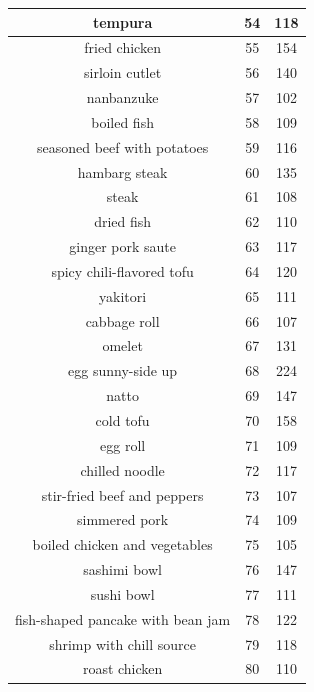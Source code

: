 {\begin{longtable}{| c | c | c|}
        \hline
        tempura  &  54  &  118  \\
        \hline
        fried chicken  &  55  &  154  \\
        \hline
        sirloin cutlet  &  56  &  140  \\
        \hline
        nanbanzuke  &  57  &  102  \\
        \hline
        boiled fish  &  58  &  109  \\
        \hline
        seasoned beef with potatoes  &  59  &  116  \\
        \hline
        hambarg steak  &  60  &  135  \\
        \hline
        steak  &  61  &  108  \\
        \hline
        dried fish  &  62  &  110  \\
        \hline
        ginger pork saute  &  63  &  117  \\
        \hline
        spicy chili-flavored tofu  &  64  &  120  \\
        \hline
        yakitori  &  65  &  111  \\
        \hline
        cabbage roll  &  66  &  107  \\
        \hline
        omelet  &  67  &  131  \\
        \hline
        egg sunny-side up  &  68  &  224  \\
        \hline
        natto  &  69  &  147  \\
        \hline
        cold tofu  &  70  &  158  \\
        \hline
        egg roll  &  71  &  109  \\
        \hline
        chilled noodle  &  72  &  117  \\
        \hline
        stir-fried beef and peppers  &  73  &  107  \\
        \hline
        simmered pork  &  74  &  109  \\
        \hline
        boiled chicken and vegetables  &  75  &  105  \\
        \hline
        sashimi bowl  &  76  &  147  \\
        \hline
        sushi bowl  &  77  &  111  \\
        \hline
        fish-shaped pancake with bean jam  &  78  &  122  \\
        \hline
        shrimp with chill source  &  79  &  118  \\
        \hline
        roast chicken  &  80  &  110  \\

\end{longtable}}
